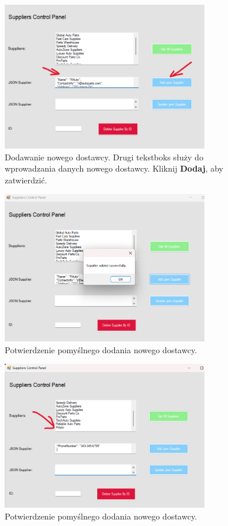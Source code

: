 \begin{figure}[h!]
    \centering
    \includegraphics[width=0.8\textwidth]{img_tests/suppliers_test_3.png}
    \caption{Dodawanie nowego dostawcy. Drugi tekstboks służy do wprowadzania danych nowego dostawcy. Kliknij \textbf{Dodaj}, aby zatwierdzić.}
    \label{fig:suppliers_test_3}
\end{figure}

\begin{figure}[h!]
    \centering
    \includegraphics[width=0.8\textwidth]{img_tests/suppliers_test_4.png}
    \caption{Potwierdzenie pomyślnego dodania nowego dostawcy.}
    \label{fig:suppliers_test_4}
\end{figure}

\begin{figure}[h!]
    \centering
    \includegraphics[width=0.8\textwidth]{img_tests/suppliers_test_5.png}
    \caption{Potwierdzenie pomyślnego dodania nowego dostawcy.}
    \label{fig:suppliers_test_5}
\end{figure}

